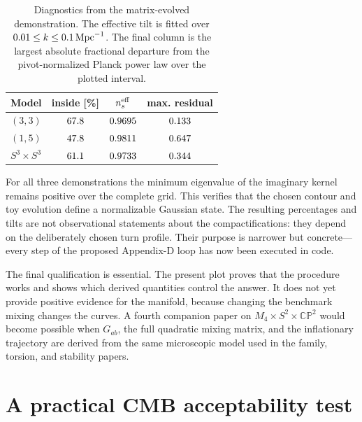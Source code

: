 \documentclass[11pt,a4paper]{article}
\newcommand{\CP}{\mathbb{CP}}
\begin{document}
\begin{table}[tbp]
\caption{Diagnostics from the matrix-evolved demonstration.  The effective tilt is fitted over $0.01\leq k\leq0.1\,{\rm Mpc}^{-1}$.  The final column is the largest absolute fractional departure from the pivot-normalized Planck power law over the plotted interval.}
\label{tab:matrixdiagnostics}
\begin{tabular}{lccc}
Model & inside [\%] & $n_s^{\rm eff}$ & max. residual\\
\hline
$(3,3)$ & $67.8$ & $0.9695$ & $0.133$\\
$(1,5)$ & $47.8$ & $0.9811$ & $0.647$\\
$S^3\times S^3$ & $61.1$ & $0.9733$ & $0.344$\\
\end{tabular}
\end{table}

For all three demonstrations the minimum eigenvalue of the imaginary kernel remains positive over the complete grid.  This verifies that the chosen contour and toy evolution define a normalizable Gaussian state.  The resulting percentages and tilts are not observational statements about the compactifications: they depend on the deliberately chosen turn profile.  Their purpose is narrower but concrete---every step of the proposed Appendix-D loop has now been executed in code.

The final qualification is essential. The present plot proves that the procedure works and shows which derived quantities control the answer. It does not yet provide positive evidence for the manifold, because changing the benchmark mixing changes the curves. A fourth companion paper on $M_4\times S^2\times\CP^2$ would become possible when $G_{ab}$, the full quadratic mixing matrix, and the inflationary trajectory are derived from the same microscopic model used in the family, torsion, and stability papers.

\section{A practical CMB acceptability test}
\label{sec:acceptance}
\end{document}
